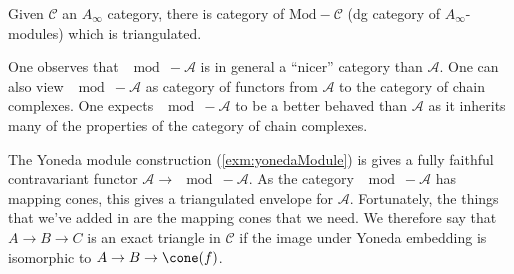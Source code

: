 
 Given $\mathcal C$ an $A_\infty$ category, there is category of $\text{Mod}-\mathcal C$ (dg category of $A_\infty$-modules) which is triangulated.








One observes that $\mod-\mathcal A$ is in general a ``nicer'' category than $\mathcal A$. One can also view $\mod-\mathcal A$ as category of functors from $\mathcal A$ to the category of chain complexes. One expects $\mod-\mathcal A$ to be a better behaved than $\mathcal A$ as it inherits many of the properties of the category of chain complexes.


The Yoneda module construction (\cref{exm:yonedaModule}) is gives a fully faithful contravariant functor $\mathcal A \to \mod-\mathcal A$.
As the category $\mod-\mathcal A$ has mapping cones, this gives a triangulated envelope for $\mathcal A$.
Fortunately, the things that we've added in are the mapping cones that we need.  We therefore say that $A\to B \to C$ is an exact triangle in $\mathcal C$ if the image under Yoneda embedding is isomorphic to $A\to B \to \cone(f)$.
